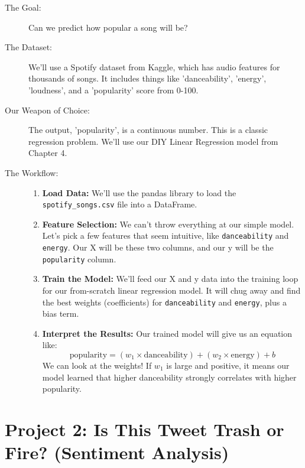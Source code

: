 \documentclass[11pt, letterpaper, openany]{book}
\begin{document}
\begin{description}
    \item[The Goal:] Can we predict how popular a song will be?
    \item[The Dataset:] We'll use a Spotify dataset from Kaggle, which has audio features for thousands of songs. It includes things like 'danceability', 'energy', 'loudness', and a 'popularity' score from 0-100.
    \item[Our Weapon of Choice:] The output, 'popularity', is a continuous number. This is a classic regression problem. We'll use our DIY Linear Regression model from Chapter 4.
    \item[The Workflow:]
    \begin{enumerate}
        \item \textbf{Load Data:} We'll use the pandas library to load the \texttt{spotify\_songs.csv} file into a DataFrame.
        \item \textbf{Feature Selection:} We can't throw everything at our simple model. Let's pick a few features that seem intuitive, like \texttt{danceability} and \texttt{energy}. Our X will be these two columns, and our y will be the \texttt{popularity} column.
        \item \textbf{Train the Model:} We'll feed our X and y data into the training loop for our from-scratch linear regression model. It will chug away and find the best weights (coefficients) for \texttt{danceability} and \texttt{energy}, plus a bias term.
        \item \textbf{Interpret the Results:} Our trained model will give us an equation like:
        \[ \text{popularity} = (w_1 \times \text{danceability}) + (w_2 \times \text{energy}) + b \]
        We can look at the weights! If $w_1$ is large and positive, it means our model learned that higher danceability strongly correlates with higher popularity.
    \end{enumerate}
\end{description}

\section{Project 2: Is This Tweet Trash or Fire? (Sentiment Analysis)}
\end{document}
